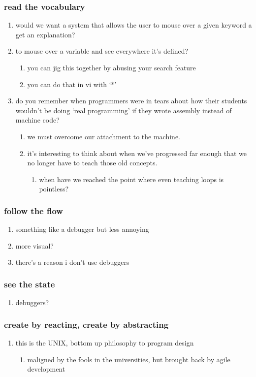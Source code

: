 \subsubsection{read the vocabulary}
\begin{enumerate}
	\item would we want a system that allows the user to mouse over a given keyword a get an explanation?
	\item to mouse over a variable and see everywhere it's defined?
	\begin{enumerate}
		\item you can jig this together by abusing your search feature
		\item you can do that in vi with `*'
	\end{enumerate}
	\item do you remember when programmers were in tears about how their students wouldn't be doing `real programming' if they wrote assembly instead of machine code?
	\begin{enumerate}
		\item we must overcome our attachment to the machine.
		\item it's interesting to think about when we've progressed far enough that we no longer have to teach those old concepts.
		\begin{enumerate}
			\item when have we reached the point where even teaching loops is pointless?
		\end{enumerate}
	\end{enumerate}
\end{enumerate}
\subsubsection{follow the flow}
\begin{enumerate}
	\item something like a debugger but less annoying
	\item more visual?
	\item there's a reason i don't use debuggers
\end{enumerate}
\subsubsection{see the state}
\begin{enumerate}
	\item debuggers?
\end{enumerate}
\subsubsection{create by reacting, create by abstracting}
\begin{enumerate}
	\item this is the UNIX, bottom up philosophy to program design
	\begin{enumerate}
		\item maligned by the fools in the universities, but brought back by agile development
	\end{enumerate}
\end{enumerate}
